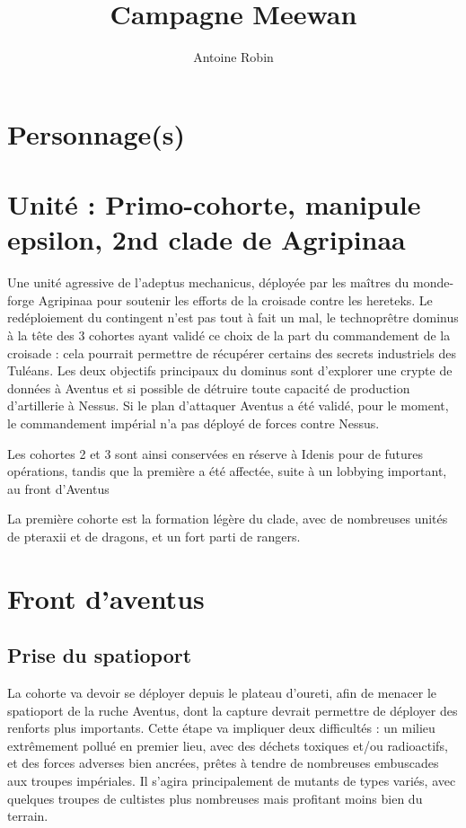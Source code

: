 \documentclass[10pt,a4paper]{book}
\author{ Antoine Robin}
\title{Campagne Meewan}
\begin{document}
\maketitle
\chapter{Personnage(s)}
\chapter{Unité : Primo-cohorte, manipule epsilon, 2nd clade de Agripinaa}
Une unité agressive de l'adeptus mechanicus, déployée par les maîtres du monde-forge Agripinaa pour soutenir les efforts de la croisade contre les hereteks. Le redéploiement du contingent n'est pas tout à fait un mal, le technoprêtre dominus à la tête des 3 cohortes ayant validé ce choix de la part du commandement de la croisade : cela pourrait permettre de récupérer certains des secrets industriels des Tuléans. Les deux objectifs principaux du dominus sont d'explorer une crypte de données à Aventus et si possible de détruire toute capacité de production d'artillerie à Nessus. Si le plan d'attaquer Aventus a été validé, pour le moment, le commandement impérial n'a pas déployé de forces contre Nessus.

Les cohortes 2 et 3 sont ainsi conservées en réserve à Idenis pour de futures opérations, tandis que la première a été affectée, suite à un lobbying important, au front d'Aventus

La première cohorte est la formation légère du clade, avec de nombreuses unités de pteraxii et de dragons, et un fort parti de rangers.
\chapter{Front d'aventus}
\section{Prise du spatioport}
La cohorte va devoir se déployer depuis le plateau d'oureti, afin de menacer le spatioport de la ruche Aventus, dont la capture devrait permettre de déployer des renforts plus importants. Cette étape va impliquer deux difficultés : un milieu extrêmement pollué en premier lieu, avec des déchets toxiques et/ou radioactifs, et des forces adverses bien ancrées, prêtes à tendre de nombreuses embuscades aux troupes impériales. Il s'agira principalement de mutants de types variés, avec quelques troupes de cultistes plus nombreuses mais profitant moins bien du terrain.
\end{document}
